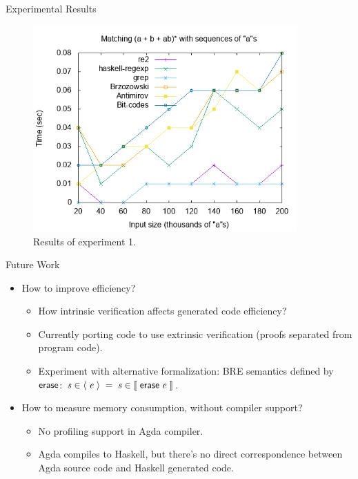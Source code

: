 \documentclass{beamer}
\newcommand{\D}[1]{\blue{\mathsf{#1}}}
\newcommand{\F}[1]{\green{\mathsf{#1}}}
\newcommand{\V}[1]{\purple{\mathit{#1}}}
\begin{document}
   \begin{frame}{Experimental Results}
     \begin{figure}[!ht]
       \includegraphics[width=0.9\textwidth]{as.png}
       \centering
       \caption{Results of experiment 1.}
       \label{fig:graph1}
     \end{figure}
   \end{frame}

   \begin{frame}{Future Work}
     \begin{itemize}
       \item How to improve efficiency?
       \begin{itemize}
         \item How intrinsic verification affects generated code efficiency?
         \item Currently porting code to use extrinsic verification (proofs separated from program code).
         \item Experiment with alternative formalization: BRE semantics defined by \ensuremath{\F{erase}}:
               \ensuremath{\V{s}\;\D{\in\langle}\;\V{e}\;\D{\rangle}\;\mathrel{=}\;\V{s}\;\D{\in\llbracket}\;\F{erase}\;\V{e}\;\D{\rrbracket}}.
       \end{itemize}
       \item How to measure memory consumption, without compiler support?
       \begin{itemize}
         \item No profiling support in Agda compiler.
         \item Agda compiles to Haskell, but there's no direct correspondence between
               Agda source code and Haskell generated code.
       \end{itemize}
     \end{itemize}
   \end{frame}
\end{document}
